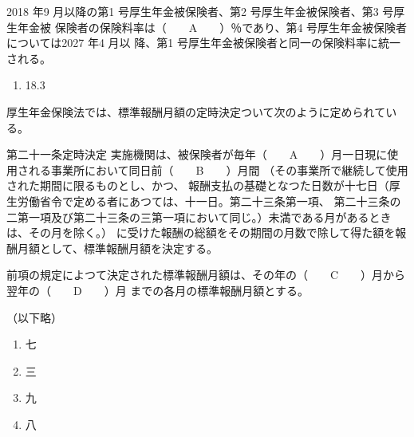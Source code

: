 \begin{fillblank}[年金1 2019 問題1(5)\textcircled{1}]
  2018 年9 月以降の第1 号厚生年金被保険者、第2 号厚生年金被保険者、第3 号厚生年金被
保険者の保険料率は（　　A　　）％であり、第4 号厚生年金被保険者については2027 年4 月以
降、第1 号厚生年金被保険者と同一の保険料率に統一される。
\end{fillblank}

\begin{answerbox}
  \begin{enumerate}[A: ]
    \item 18.3
  \end{enumerate}
\end{answerbox}



\begin{fillblank}[年金1 2019 問題1(5)\textcircled{2}]
  厚生年金保険法では、標準報酬月額の定時決定ついて次のように定められている。

  \begin{lawstructure}
    \begin{lawarticle}{第二十一条}{定時決定}
      実施機関は、被保険者が毎年（　　A　　）月一日現に使用される事業所において同日前（　　B　　）月間
      （その事業所で継続して使用された期間に限るものとし、かつ、
      報酬支払の基礎となつた日数が十七日（厚生労働省令で定める者にあつては、十一日。第二十三条第一項、
      第二十三条の二第一項及び第二十三条の三第一項において同じ。）未満である月があるときは、その月を除く。）
      に受けた報酬の総額をその期間の月数で除して得た額を報酬月額として、標準報酬月額を決定する。

      前項の規定によつて決定された標準報酬月額は、その年の（　　C　　）月から翌年の（　　D　　）月
      までの各月の標準報酬月額とする。

      （以下略）
    \end{lawarticle}
  \end{lawstructure}

\end{fillblank}

\begin{answerbox}
  \begin{enumerate}[A: ]
    \item 七
    \item 三
    \item 九
    \item 八
  \end{enumerate}
\end{answerbox}

